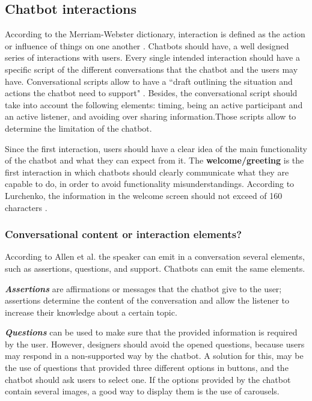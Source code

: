 \documentclass[a4paper,10pt]{article}
\begin{document}
\subsection*{Chatbot interactions}

According to the Merriam-Webster dictionary, interaction is defined as the action or influence of things on one another \cite{merriam-webster}.
Chatbots should have, a well designed series of interactions with users. Every single intended interaction should have a specific script of the different conversations that the chatbot and the users may have. Conversational scripts allow to have a ``draft outlining the situation and actions the chatbot need to support" \cite{CaseStudy}. Besides, the conversational script should take into account the following elements: timing, being an active participant and an active listener, and avoiding over sharing information.Those scripts allow to determine the limitation of the chatbot. 

Since the first interaction, users should have a clear idea of the main functionality of the chatbot and what they can expect from it.
The \textbf{welcome/greeting} is the first interaction in which chatbots should clearly communicate what they are capable to do, in order to avoid functionality misunderstandings. According to Lurchenko, the information in the welcome screen should not exceed of 160 characters \cite{CheatSheet}. 

\subsubsection*{Conversational content or interaction elements?}
According to Allen et al. \cite{allen1978conversation} the speaker can emit in a conversation several elements, such as assertions, questions, and support. Chatbots can emit the same elements. 

\textbf{\textit{Assertions}} are affirmations or messages that the chatbot give to the user; assertions determine the content of the conversation and allow the listener to increase their knowledge about a certain topic. 

\textbf{\textit{Questions}} can be used to make sure that the provided information is required by the user. However, designers should avoid the opened questions, because users may respond in a non-supported way by the chatbot. A solution for this, may be the use of questions that provided three different options in buttons, and the chatbot should ask users to select one. If the options provided by the chatbot contain several images, a good way to display them is the use of carousels. 
\end{document}
